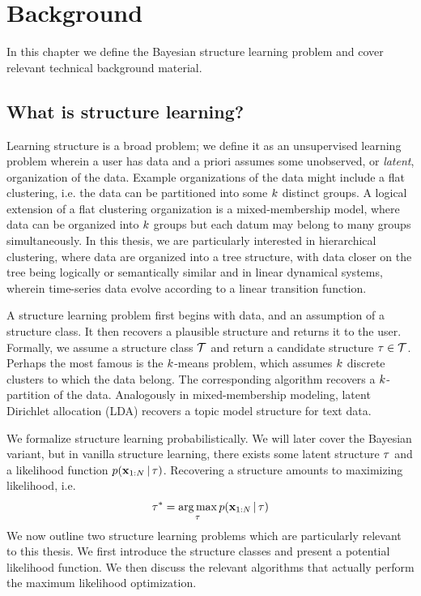 \chapter{Background}
In this chapter we define the Bayesian structure learning problem and cover relevant technical background material.

\section{What is structure learning?}
Learning structure is a broad problem; we define it as an unsupervised learning problem wherein a user has data
and a priori assumes some unobserved, or \emph{latent}, organization of the data. Example organizations of the data might include a flat clustering, i.e. the data can be partitioned into some $k$ distinct groups. A logical extension of a flat clustering organization is a mixed-membership model, where data can be organized into $k$ groups but each datum may belong to many groups simultaneously. 
In this thesis, we are particularly interested in hierarchical clustering, where data are organized into a tree structure, with data closer on the tree being logically or semantically similar and in
linear dynamical systems, wherein time-series data
evolve according to a linear transition function.

A structure learning problem first begins with data, and an assumption of a structure class. It then recovers a plausible structure and returns it to the user. Formally, we assume a structure class $\mathcal{T}$ and return a candidate structure $\tau \in \mathcal{T}$.
Perhaps the most famous is the $k$-means problem, which assumes $k$ discrete clusters to which the data belong. The corresponding algorithm recovers a $k$-partition of the data.  Analogously in mixed-membership modeling, latent Dirichlet allocation (LDA) recovers a topic model structure for text data.

We formalize structure learning probabilistically. We will later cover the Bayesian variant, but in vanilla structure learning,
there exists some latent structure $\tau$
and a likelihood function $p(\mathbf{x}_{1:N} \,|\, \tau)$.
Recovering a structure amounts to
maximizing likelihood, i.e.
\begin{align*}
    \tau^* = \operatorname*{arg\,max}_{\tau} p(\mathbf{x}_{1:N} \,|\, \tau)
\end{align*}
We now outline two structure learning problems
which are particularly relevant to this thesis. We first introduce the structure classes and present a potential likelihood function. We then discuss the relevant
algorithms that actually perform
the maximum likelihood optimization.

